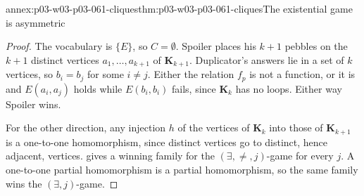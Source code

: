 \begin{annexitem}{annex:p03-w03-p03-061-cliques}{thm:p03-w03-p03-061-cliques}{The existential game is asymmetric}
\begin{proof}
The vocabulary is \(\{E\}\), so \(C=\emptyset\). Spoiler places his
\(k+1\) pebbles on the \(k+1\) distinct vertices \(a_1,\ldots,a_{k+1}\) of
\(\mathbf K_{k+1}\). Duplicator's answers lie in a set of \(k\) vertices, so
\(b_i=b_j\) for some \(i\neq j\). Either the relation \(f_p\) is not a
function, or it is and \(E(a_i,a_j)\) holds while \(E(b_i,b_i)\) fails, since
\(\mathbf K_k\) has no loops. Either way Spoiler wins.

For the other direction, any injection \(h\) of the vertices of \(\mathbf
K_k\) into those of \(\mathbf K_{k+1}\) is a one-to-one homomorphism, since
distinct vertices go to distinct, hence adjacent, vertices.
 gives a winning family for the
\((\exists,\neq,j)\)-game for every \(j\). A one-to-one partial homomorphism
is a partial homomorphism, so the same family wins the \((\exists,j)\)-game.
\end{proof}
\end{annexitem}

